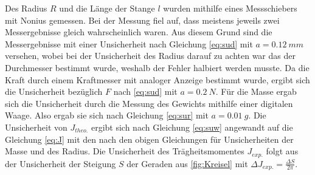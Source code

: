 Des Radius $R$ und die Länge der Stange $l$ wurden mithilfe eines Messschiebers mit Nonius gemessen. Bei der Messung fiel auf, dass meistens jeweils  zwei Messergebnisse gleich wahrscheinlich  waren. Aus diesem Grund sind die Messergebnisse mit einer Unsicherheit nach Gleichung \ref{eq:sud} mit $a=\SI{0,12}{mm}$ versehen, wobei bei der Unsicherheit des Radius darauf zu achten war das der Durchmesser bestimmt wurde, weshalb der Fehler halbiert werden musste. Da die Kraft durch einem Kraftmesser mit analoger Anzeige bestimmt wurde, ergibt sich die Unsicherheit bezüglich $F$ nach \ref{eq:sud} mit $a=\SI{0,2}{N}$. Für die Masse  ergab sich die Unsicherheit durch die Messung des Gewichts mithilfe einer digitalen Waage. Also ergab sie sich nach Gleichung \ref{eq:sur} mit $a=\SI{0,01}{g}$. 
Die Unsicherheit von $J_{theo.}$ ergibt sich nach Gleichung \ref{eq:suw} angewandt auf die Gleichung \ref{eq:J} mit den nach den obigen Gleichungen für Unsicherheiten der Masse und des Radius.
Die Unsicherheit des Trägheitsmomentes $J_{exp.}$ folgt aus der Unsicherheit der Steigung $S$ der Geraden aus \cref{fig:Kreisel} mit $\Delta J_{exp.}=\frac{\Delta S}{2  \pi}$.

